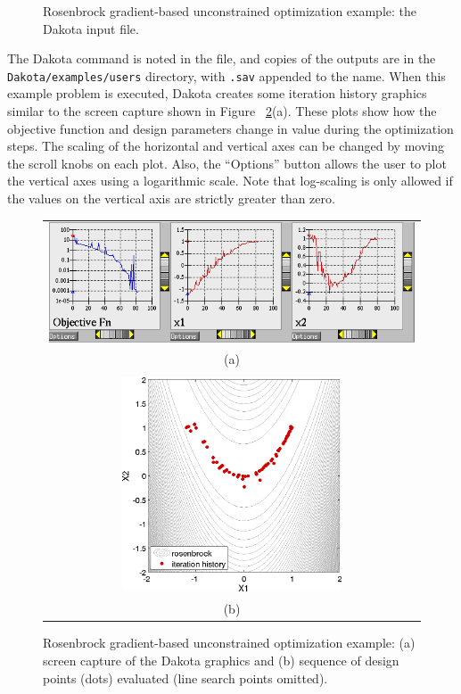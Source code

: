 \begin{figure}
  \centering
  \begin{bigbox}
    \begin{small}
    \end{small}
  \end{bigbox}
  \caption{Rosenbrock gradient-based unconstrained optimization
  example: the Dakota input file.}
  \label{tutorial:rosenbrock_grad}
\end{figure}

The Dakota command is noted in the file, and copies of the outputs
are in the \texttt{Dakota/examples/users} directory, with \texttt{.sav} 
appended to the name.  When this
example problem is executed, Dakota creates some iteration history
graphics similar to the screen capture shown in Figure~
\ref{tutorial:rosenbrock_grad_graphics}(a). These plots show
how the objective function and design parameters change in value
during the optimization steps. The scaling of the horizontal and
vertical axes can be changed by moving the scroll knobs on each plot.
Also, the ``Options'' button allows the user to plot the vertical axes
using a logarithmic scale. Note that log-scaling is only allowed if
the values on the vertical axis are strictly greater than zero.

\begin{figure}[ht!]
  \centering
  \begin{tabular}{c}
  \includegraphics[width=\textwidth]{images/dak_graphics_grad_opt}\\
  (a)\\
  \qquad\\
  \includegraphics[height=2.5in]{images/rosen_grad_opt_pts} \\
  (b)
  \end{tabular}
  \caption{Rosenbrock gradient-based unconstrained optimization
    example: (a) screen capture of the Dakota graphics and (b)
    sequence of design points (dots) evaluated (line search points
    omitted).}
  \label{tutorial:rosenbrock_grad_graphics}
\end{figure}

